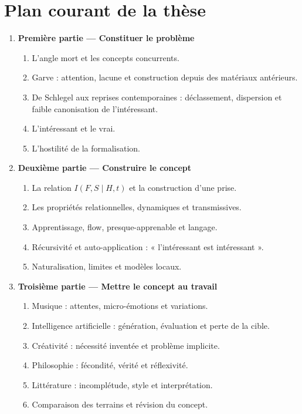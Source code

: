 \documentclass[11pt,a4paper]{article}
\begin{document}
\section{Plan courant de la thèse}

\begin{enumerate}
  \item \textbf{Première partie --- Constituer le problème}
    \begin{enumerate}
      \item L'angle mort et les concepts concurrents.
      \item Garve : attention, lacune et construction depuis des matériaux
            antérieurs.
      \item De Schlegel aux reprises contemporaines : déclassement, dispersion
            et faible canonisation de l'intéressant.
      \item L'intéressant et le vrai.
      \item L'hostilité de la formalisation.
    \end{enumerate}
  \item \textbf{Deuxième partie --- Construire le concept}
    \begin{enumerate}
      \item La relation \(I(F,S\mid H,t)\) et la construction d'une prise.
      \item Les propriétés relationnelles, dynamiques et transmissives.
      \item Apprentissage, flow, presque-apprenable et langage.
      \item Récursivité et auto-application : « l'intéressant est intéressant ».
      \item Naturalisation, limites et modèles locaux.
    \end{enumerate}
  \item \textbf{Troisième partie --- Mettre le concept au travail}
    \begin{enumerate}
      \item Musique : attentes, micro-émotions et variations.
      \item Intelligence artificielle : génération, évaluation et perte de la
            cible.
      \item Créativité : nécessité inventée et problème implicite.
      \item Philosophie : fécondité, vérité et réflexivité.
      \item Littérature : incomplétude, style et interprétation.
      \item Comparaison des terrains et révision du concept.
    \end{enumerate}
\end{enumerate}
\end{document}

